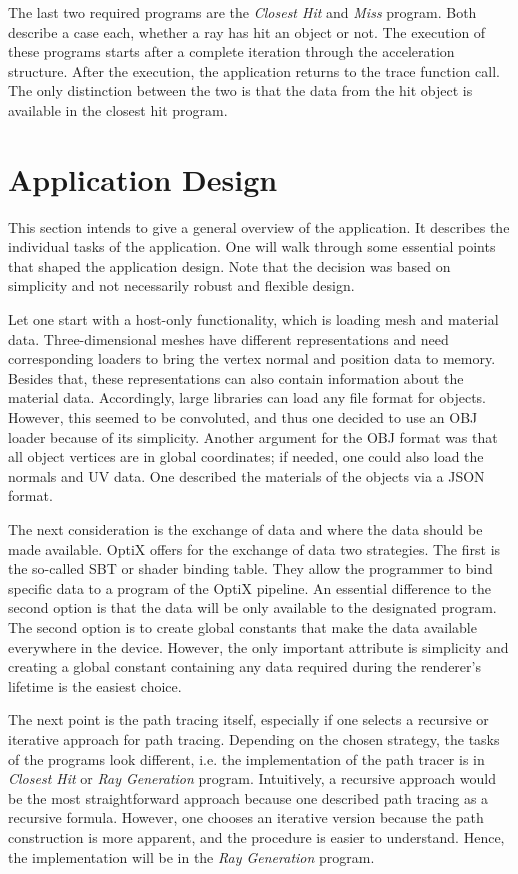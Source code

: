 The last two required programs are the \textit{Closest Hit} and \textit{Miss} program.
Both describe a case each, whether a ray has hit an object or not.
The execution of these programs starts after a complete iteration through the acceleration structure. 
After the execution, the application returns to the trace function call.
The only distinction between the two is that the data from the hit object is available in the closest hit program.

\section{Application Design}

This section intends to give a general overview of the application.
It describes the individual tasks of the application.
One will walk through some essential points that shaped the application design.
Note that the decision was based on simplicity and not necessarily robust and flexible design.

Let one start with a host-only functionality, which is loading mesh and material data.
Three-dimensional meshes have different representations and need corresponding loaders to bring the vertex normal and position data to memory.
Besides that, these representations can also contain information about the material data.
Accordingly, large libraries can load any file format for objects.
However, this seemed to be convoluted, and thus one decided to use an OBJ loader because of its simplicity. 
Another argument for the OBJ format was that all object vertices are in global coordinates; if needed, one could also load the normals and UV data.
One described the materials of the objects via a JSON format.

The next consideration is the exchange of data and where the data should be made available.
OptiX offers for the exchange of data two strategies.
The first is the so-called SBT or shader binding table.
They allow the programmer to bind specific data to a program of the OptiX pipeline.
An essential difference to the second option is that the data will be only available to the designated program.
The second option is to create global constants that make the data available everywhere in the device.
However, the only important attribute is simplicity and creating a global constant containing any data required during the renderer's lifetime is the easiest choice.

The next point is the path tracing itself, especially if one selects a recursive or iterative approach for path tracing.
Depending on the chosen strategy, the tasks of the programs look different, i.e. the implementation of the path tracer is in \textit{Closest Hit}  or \textit{Ray Generation} program.
Intuitively, a recursive approach would be the most straightforward approach because one described path tracing as a recursive formula.
However, one chooses an iterative version because the path construction is more apparent, and the procedure is easier to understand.
Hence, the implementation will be in the \textit{Ray Generation} program.

